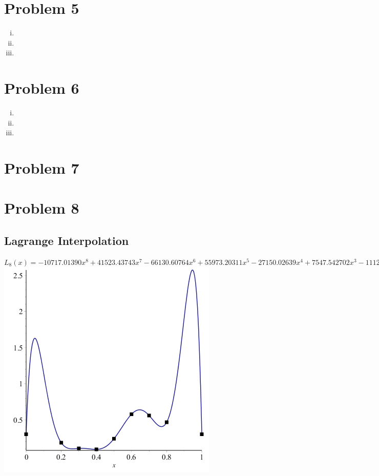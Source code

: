 \documentclass[11pt]{article} %
\begin{document}


\section*{Problem 5}
\begin{enumerate}[i.)]
\item
\item
\item
\end{enumerate}
\section*{Problem 6}
\begin{enumerate}[i.)]
\item
\item
\item
\end{enumerate}
\section*{Problem 7}

\section*{Problem 8}
\subsection*{Lagrange Interpolation}
$L_8(x) = -10717.01390x^8 + 41523.43743x^7 - 66130.60764x^6 + 55973.20311x^5 - 27150.02639x^4 +7547.542702x^3 - 1112.916584x^2 + 66.38116670x + .302$\\
\includegraphics[scale=.5]{plots/problem7plot1.png}
\end{document}
